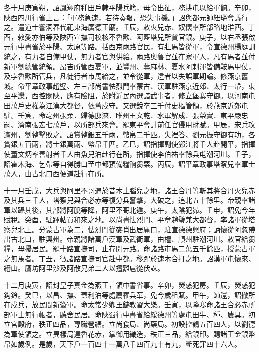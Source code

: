 \begin{pinyinscope}
 冬十月庚寅朔，詔鳳翔府種田戶隸平陽兵籍，毋令出征，務耕屯以給軍餉。辛卯，陜西四川行省上言：「軍務急速，若待奏報，恐失事機。」詔與都元帥紐璘會議行之。遣道士訾洞春代祀東海廣德王廟。壬辰，敕火兒赤、奴懷率所部略地淮西。丁酉，敕愛亦伯等及陜西宣撫司校核不魯歡、阿藍塔兒所貸官銀。庚子，以右丞張啟元行中書省於平陽、太原等路。括西京兩路官民，有壯馬皆從軍，令宣德州楊庭訓統之，有力者自備甲仗，無力者官與供給。兩路奧魯官並在家軍人，凡有馬者並付新軍劉總管統領。昂吉所管西夏軍，並豐州、蕁麻林、夏水阿剌渾皆備鞍馬甲仗，及孛魯歡所管兵，凡徒行者市馬給之，並令從軍，違者以失誤軍期論。修燕京舊城。命平章政事趙璧、左三部尚書怯烈門率蒙古、漢軍駐燕京近郊、太行一帶，東至平灤，西控關陜，應有險阻，於附近民內選諳武事者，修立堡寨守御。以河南屯田萬戶史權為江漢大都督，依舊戍守。又選銳卒三千付史樞管領，於燕京近郊屯駐。壬寅，命亳州張柔、歸德邸浹、睢州王文乾、水軍解成、張榮實、東平嚴忠嗣、濟南張宏七萬戶，以所部兵來會。罷東平會計前任官侵用財賦。甲辰，宋兵攻瀘州，劉整擊敗之。詔賞整銀五千兩，幣帛二千匹。失裡答、劉元振守御有功，各賞銀五百兩，將士銀萬兩、幣帛千匹。乙巳，詔指揮副使鄭江將千人赴開平，指揮使董文炳率善射者千人由魚兒泊赴行在所，指揮使李伯祐率餘兵屯潮河川。壬子，詔霍木海、乞帶等自得勝口至中都預備糧餉芻粟。丙辰，詔平章政事塔察兒率軍士萬人，由古北口西便道赴行在所。



 十一月壬戌，大兵與阿里不哥遇於昔木土腦兒之地，諸王合丹等斬其將合丹火兒赤及其兵三千人，塔察兒與合必赤等復分兵奮擊，大破之，追北五十餘里。帝親率諸軍以躡其後，其部將阿脫等降，阿里不哥北遁。庚午，太陰犯昴。壬申，詔免今年賦稅。癸酉，駐蹕帖買和來之地。以尚書怯烈門、平章趙璧兼大都督，率諸軍從塔察兒北上。分蒙古軍為二，怯烈門從麥肖出居庸口，駐宣德德興府；訥懷從阿忽帶出古北口，駐興州。帝親將諸萬戶漢軍及武衛軍，由檀、順州駐潮河川。敕官給芻糧，毋擾居民。罷十路宣撫司，止存開元路。命諸路市馬二萬五千餘匹，授蒙古軍之無馬者。丁丑，徵諸路宣撫司官赴中都。移蹕於速木合打之地。詔漢軍屯懷來、縉山。鷹坊阿里沙及阿散兄弟二人以擅離扈從伏誅。



 十二月庚寅，詔封皇子真金為燕王，領中書省事。辛卯，熒惑犯房。壬辰，熒惑犯鉤鈐。癸巳，以昌、撫、蓋利泊等處薦罹兵革，免今歲租賦。甲午，師還，詔撤所在戍兵，放民間新簽軍。命太常少卿王鏞教習大樂。壬寅，以隆寒命諸王合必赤所部軍士無行帳者，聽舍民居。命陜蜀行中書省給綏德州等處屯田牛、種、農具。初立宮殿府，秩正四品，專職營繕。立尚食局、尚藥局。初設控鶴五百四人，以劉德為軍使領之。立異樣局達魯花赤，掌御用織造，秩正三品，給銀印。賜諸王金銀幣帛如歲例。是歲，天下戶一百四十一萬八千四百九十有九，斷死罪四十六人。



\end{pinyinscope}